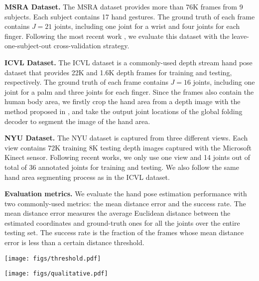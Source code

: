 \documentclass[10pt,twocolumn,letterpaper]{article}
\begin{document}
{\bf MSRA Dataset.} The MSRA dataset \cite{sun2015cascaded} provides more than 76K frames from 9 subjects. Each subject contains 17 hand gestures. The ground truth of each frame contains $J = 21$ joints, including one joint for a wrist and four joints for each finger. Following the most recent work \cite{sun2015cascaded}, we evaluate this dataset with the leave-one-subject-out cross-validation strategy.


{\bf ICVL Dataset.} The ICVL dataset \cite{tang2014latent} is a commonly-used depth stream hand pose dataset that provides 22K and 1.6K depth frames for training and testing, respectively. The ground truth of each frame contains $J = 16$ joints, including one joint for a palm and three joints for each finger. Since the frames also contain the human body area, we firstly crop the hand area from a depth image with the method proposed in \cite{oberweger2017deepprior++}, and take the output joint locations of the global folding decoder to segment the image of the hand area.


{\bf NYU Dataset.} The NYU dataset is captured from three different views. Each view contains 72K training 8K testing depth images captured with the Microsoft Kinect sensor. Following recent works, we only use one view and 14 joints out of total of 36 annotated joints for training and testing.
We also follow the same hand area segmenting process as in the ICVL dataset.




{\bf Evaluation metrics.}
We evaluate the hand pose estimation performance with two commonly-used metrics: the mean distance error and the success rate. The mean distance error measures the average Euclidean distance between the estimated coordinates and ground-truth ones for all the joints over the entire testing set. The success rate is the fraction of the frames whose mean distance error is less than a certain distance threshold.



\begin{figure*}
\centering
\texttt{[image: figs/threshold.pdf]}
\caption{Comparison with the state-of-the-art methods using the ICVL (left), MSRA (middle) and NYU (right) dataset. The success rate is shown in this figure.}
\label{fig:threshold}
\end{figure*}

\begin{figure*}
\centering
\texttt{[image: figs/qualitative.pdf]}
\caption{Qualitative results of HandFoldingNet on the ICVL (left), MSRA (middle) and NYU (right) dataset. Hand depth images are transformed into 3D points as shown in the figure. Ground truth is shown in black, and the estimated joint coordinates are shown in red.}
\label{fig:qualitative}
\end{figure*}
\end{document}
